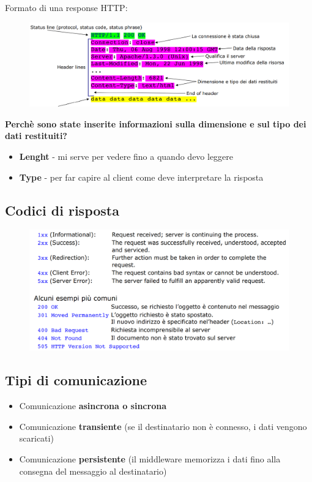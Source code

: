 \documentclass[12pt, a4paper]{article}
\begin{document}
    \newpage
    Formato di una response HTTP:
    \begin{figure}[htbp]
        \centering
        \includegraphics[scale=0.4]{httpresponse.png}
    \end{figure}

    \textbf{Perchè sono state inserite informazioni sulla dimensione e sul tipo dei dati restituiti?}

    \begin{itemize}
        \item \textbf{Lenght} - mi serve per vedere fino a quando devo leggere
        \item \textbf{Type} - per far capire al client come deve interpretare la risposta
    \end{itemize}

    \subsection{Codici di risposta}
    \begin{figure}[htbp]
        \centering
        \includegraphics[scale=0.4]{codici.png}
    \end{figure}    

    \subsection{Tipi di comunicazione}
    \begin{itemize}
        \item Comunicazione \textbf{asincrona o sincrona}
        \item Comunicazione \textbf{transiente} (se il destinatario non è connesso, i dati vengono scaricati)
        \item Comunicazione \textbf{persistente} (il middleware memorizza i dati fino alla consegna del messaggio al destinatario)
    \end{itemize}
    
\end{document}
